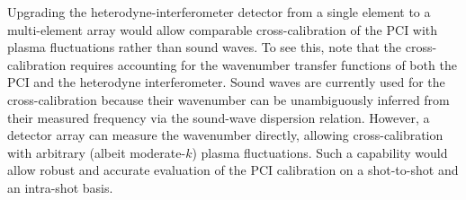 Upgrading the heterodyne-interferometer detector
from a single element to a multi-element array
would allow comparable cross-calibration of the PCI
with plasma fluctuations rather than sound waves.
To see this, note that the cross-calibration requires
accounting for the wavenumber transfer functions
of both the PCI and the heterodyne interferometer.
Sound waves are currently used for the cross-calibration
because their wavenumber can be unambiguously inferred
from their measured frequency via the sound-wave dispersion relation.
However, a detector array can measure the wavenumber directly,
allowing cross-calibration with arbitrary
(albeit moderate-$k$) plasma fluctuations.
Such a capability would allow robust and accurate evaluation
of the PCI calibration on a shot-to-shot and an intra-shot basis.


%
%
%
%
